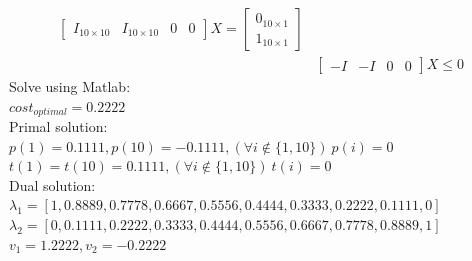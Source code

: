 \documentclass[12pt,letter]{article}
\begin{document}
\begin{enumerate}
\begin{enumerate}
\begin{align*}
\begin{bmatrix}
                I_{10\times 10} & I_{10\times 10} & 0 & 0
              \end{bmatrix}X =
                                                          \begin{bmatrix}
                                                            0_{10\times 1}\\
                                                            1_{10\times 1}
                                                          \end{bmatrix}\\
      &\begin{bmatrix}
        -I & -I & 0 & 0
      \end{bmatrix} X \leq 0
    \end{align*}
    Solve using Matlab:\\
    $cost_{optimal}=0.2222$\\
    Primal solution:\\
    $p(1)=0.1111, p(10)=-0.1111, (\forall i \not\in \{1,10\})\ p(i)=0$\\
    $t(1)=t(10)=0.1111, (\forall i \not\in \{1,10\})\ t(i)=0$\\
    
    Dual solution:\\
    $\lambda_1 = [1,0.8889,0.7778,0.6667,0.5556,0.4444,0.3333,0.2222,0.1111,0]$\\
    $\lambda_2 = [0, 0.1111, 0.2222, 0.3333, 0.4444, 0.5556, 0.6667, 0.7778, 0.8889, 1]$\\
    $v_1=1.2222, v_2 =-0.2222$\\
    

\end{enumerate}
\end{enumerate}
\end{document}
